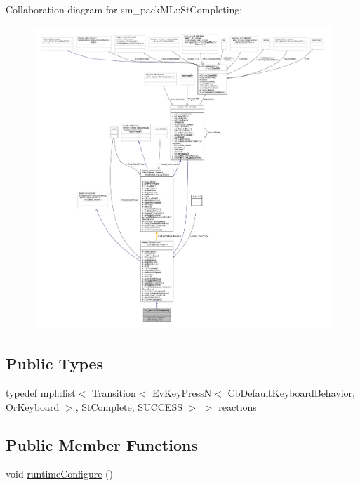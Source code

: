 Collaboration diagram for sm\+\_\+pack\+ML\+:\+:St\+Completing\+:
\nopagebreak
\begin{figure}[H]
\begin{center}
\leavevmode
\includegraphics[width=350pt]{structsm__packML_1_1StCompleting__coll__graph}
\end{center}
\end{figure}
\subsection*{Public Types}
\begin{DoxyCompactItemize}
\item 
typedef mpl\+::list$<$ Transition$<$ Ev\+Key\+PressN$<$ Cb\+Default\+Keyboard\+Behavior, \hyperlink{classsm__packML_1_1OrKeyboard}{Or\+Keyboard} $>$, \hyperlink{structsm__packML_1_1StComplete}{St\+Complete}, \hyperlink{classSUCCESS}{S\+U\+C\+C\+E\+SS} $>$ $>$ \hyperlink{structsm__packML_1_1StCompleting_ac7d5fc66e935874dfea9279c6205e0bb}{reactions}
\end{DoxyCompactItemize}
\subsection*{Public Member Functions}
\begin{DoxyCompactItemize}
\item 
void \hyperlink{structsm__packML_1_1StCompleting_a3d02e214c28fb1b9081aee053c608a8b}{runtime\+Configure} ()
\end{DoxyCompactItemize}
